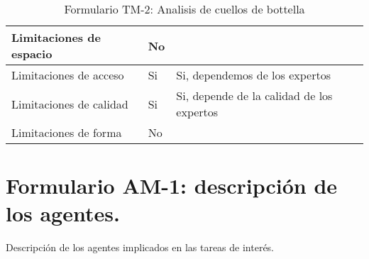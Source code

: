 \begin{table}[H]
{\begin{tabular}{|l|l|l|}
		Limitaciones de espacio& \multicolumn{1}{p{1.0cm}|}{No} & \multicolumn{1}{p{13.0cm}|}{}\\
		\hline

		Limitaciones de acceso& \multicolumn{1}{p{1.0cm}|}{Si} & \multicolumn{1}{p{13.0cm}|}{Si, dependemos de los expertos}\\
		\hline

		Limitaciones de calidad& \multicolumn{1}{p{1.0cm}|}{Si} & \multicolumn{1}{p{13.0cm}|}{Si, depende de la calidad de los expertos}\\
		\hline

		Limitaciones de forma& \multicolumn{1}{p{1.0cm}|}{No} & \multicolumn{1}{p{13.0cm}|}{}\\
		\hline

	  \end{tabular}
	}
	\caption{\label{tab:TM2}Formulario TM-2: Analisis de cuellos de bottella}
  \end{table}

\section{Formulario AM-1: descripción de los agentes.}
Descripción de los agentes implicados en las tareas de interés.

\begin{table}[H]
	\centering
	\caption{\label{tab:AM}Formulario AM-1: Analisis de agentes}
  \end{table}






